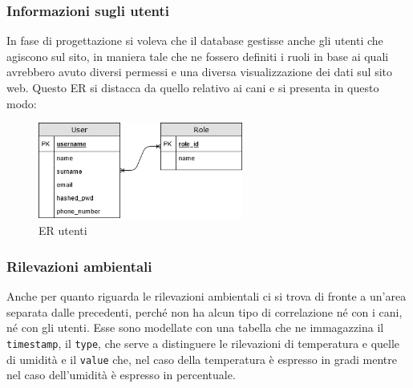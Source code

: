      \subsubsection{Informazioni sugli utenti}
     In fase di progettazione si voleva che il database gestisse anche gli utenti che agiscono sul sito, in maniera tale che ne fossero definiti i ruoli in base ai quali avrebbero avuto diversi permessi e una diversa visualizzazione dei dati sul sito web.
     Questo ER si distacca da quello relativo ai cani e si presenta in questo modo:
         \begin{figure}[H]
        \caption{ER utenti}
        \label{fig:userER}
        \centering
        \includegraphics[width=0.6\textwidth]{DrawIo/UserER.png}
    \end{figure}
    
    \subsubsection{Rilevazioni ambientali}
    Anche per quanto riguarda le rilevazioni ambientali ci si trova di fronte a un'area separata dalle precedenti, perché non ha alcun tipo di correlazione né con i cani, né con gli utenti. Esse sono modellate con una tabella che ne immagazzina il \texttt{timestamp}, il \texttt{type}, che serve a distinguere le rilevazioni di temperatura e quelle di umidità e il \texttt{value} che, nel caso della temperatura è espresso in gradi mentre nel caso dell'umidità è espresso in percentuale. 

